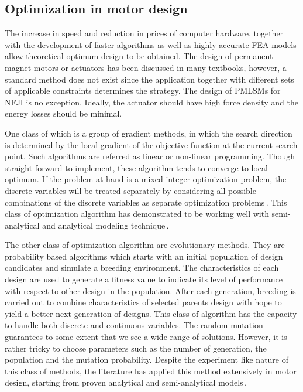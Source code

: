     \subsection{Optimization in motor design}        \label{Chapter:background/optimization methods/optimization in motor design}
    
    
        The increase in speed and reduction in prices of computer hardware, together with the development of faster algorithms as well as highly accurate \acs{FEA} models allow theoretical optimum design to be obtained. The design of permanent magnet motors or actuators has been discussed in many textbooks, however, a standard method does not exist since the application together with different sets of applicable constraints determines the strategy. The design of \acsp{PMLSM} for \acs{NFJI} is no exception. Ideally, the actuator should have high force density and the energy losses should be minimal. 
    
        
        One class of which is a group of gradient methods, in which the search direction is determined by the local gradient of the objective function at the current search point. Such algorithms are referred as linear or non-linear programming. Though straight forward to implement, these algorithm tends to converge to local optimum. If the problem at hand is a mixed integer optimization problem, the discrete variables will be treated separately by considering all possible combinations of the discrete variables as separate optimization problems\,\cite{Ruddy2015a}. This class of optimization algorithm has demonstrated to be working well with semi-analytical and analytical modeling technique\,\cite{Overboom2010DesignZ-module,Aleksandrov2018DesignTracks,Fang2008}. 
        
        
        The other class of optimization algorithm are evolutionary methods. They are probability based algorithms which starts with an initial population of design candidates and simulate a breeding environment. The characteristics of each design are used to generate a fitness value to indicate its level of performance with respect to other design in the population. After each generation, breeding is carried out to combine characteristics of selected parents design with hope to yield a better next generation of designs. This class of algorithm has the capacity to handle both discrete and continuous variables. The random mutation guarantees to some extent that we see a wide range of solutions. However, it is rather tricky to choose parameters such as the number of generation, the population and the mutation probability. Despite the experiment like nature of this class of methods, the literature has applied this method extensively in motor design, starting from proven analytical and semi-analytical models\,\cite{Isfahani2007,Li2014DesignAlgorithm,Mallik2017EfficiencyAlgorithm,RuiHuang2008MinimizationArray}.
        

